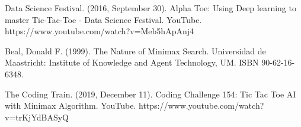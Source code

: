 \documentclass[conference]{IEEEtran}
\begin{document}
\begin{thebibliography}{00}
 Data Science Festival. (2016, September 30). Alpha Toe: Using Deep learning to master Tic-Tac-Toe - Data Science Festival. YouTube. https://www.youtube.com/watch?v=Meb5hApAnj4

 Beal, Donald F. (1999). The Nature of Minimax Search. Universidad de Maastricht: Institute of Knowledge and Agent Technology, UM. ISBN 90-62-16-6348.

 The Coding Train. (2019, December 11). Coding Challenge 154: Tic Tac Toe AI with Minimax Algorithm. YouTube. https://www.youtube.com/watch?v=trKjYdBASyQ


\end{thebibliography}
\end{document}

